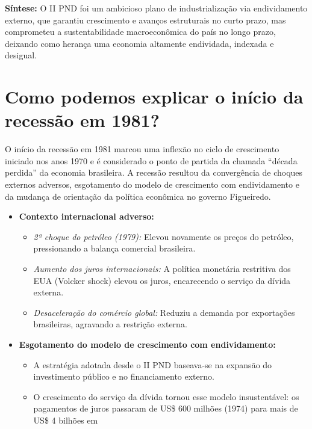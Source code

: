 \documentclass{sciposter}
\begin{document}
\begin{multicols}{3}
\textbf{Síntese:} O II PND foi um ambicioso plano de industrialização via endividamento externo, que garantiu crescimento e avanços estruturais no curto prazo, mas comprometeu a sustentabilidade macroeconômica do país no longo prazo, deixando como herança uma economia altamente endividada, indexada e desigual.

\section{\textbf{Como podemos explicar o início da recessão em 1981?}}

O início da recessão em 1981 marcou uma inflexão no ciclo de crescimento iniciado nos anos 1970 e é considerado o ponto de partida da chamada “década perdida” da economia brasileira. A recessão resultou da convergência de choques externos adversos, esgotamento do modelo de crescimento com endividamento e da mudança de orientação da política econômica no governo Figueiredo.

\begin{itemize}
    \item \textbf{ Contexto internacional adverso:}
    \begin{itemize}
        \item \textit{2º choque do petróleo (1979):} Elevou novamente os preços do petróleo, pressionando a balança comercial brasileira.
        \item \textit{Aumento dos juros internacionais:} A política monetária restritiva dos EUA (Volcker shock) elevou os juros, encarecendo o serviço da dívida externa.
        \item \textit{Desaceleração do comércio global:} Reduziu a demanda por exportações brasileiras, agravando a restrição externa.
    \end{itemize}

    \item \textbf{ Esgotamento do modelo de crescimento com endividamento:}
    \begin{itemize}
        \item A estratégia adotada desde o II PND baseava-se na expansão do investimento público e no financiamento externo.
        \item O crescimento do serviço da dívida tornou esse modelo insustentável: os pagamentos de juros passaram de US\$ 600 milhões (1974) para mais de US\$ 4 bilhões em
    \end{itemize}
\end{itemize}


\end{multicols}
\end{document}
